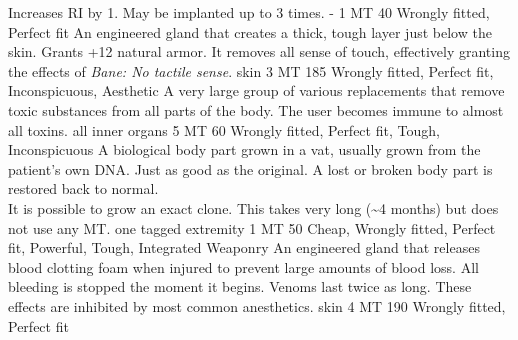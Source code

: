 \begin{multicols}{2}
    {Increases RI by 1.
        May be implanted up to 3 times.}
    {-}
    {1 MT}
    {40}
    {Wrongly fitted, Perfect fit}
    {An engineered gland that creates a thick, tough layer just below the skin.}
    {Grants +12 natural armor.
        It removes all sense of touch,
        effectively granting the effects of \emph{Bane: No tactile sense}.}
    {skin}
    {3 MT}
    {185}
    {Wrongly fitted, Perfect fit, Inconspicuous, Aesthetic}
    {A very large group of various replacements that remove toxic substances from all parts of the body.}
    {The user becomes immune to almost all toxins.}
    {all inner organs}
    {5 MT}
    {60}
    {Wrongly fitted, Perfect fit, Tough, Inconspicuous}
    {A biological body part grown in a vat,
        usually grown from the patient's own DNA.
        Just as good as the original.}
    {A lost or broken body part is restored back to normal.
    	\\%
        It is possible to grow an exact clone.
        This takes very long (\sim 4 months) but does not use any MT.}
    {one tagged extremity}
    {1 MT}
    {50}
    {Cheap, Wrongly fitted, Perfect fit, Powerful, Tough, Integrated Weaponry}
    {An engineered gland that releases blood clotting foam when injured to prevent large amounts of blood loss.}
    {All bleeding is stopped the moment it begins.
        Venoms last twice as long.
        These effects are inhibited by most common anesthetics.}
    {skin}
    {4 MT}
    {190}
    {Wrongly fitted, Perfect fit}
\end{multicols}

